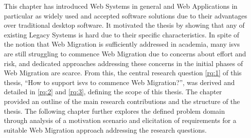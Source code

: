 This chapter has introduced \glspl{Web System} in general and \glspl{Web Application} in particular as widely used and accepted software solutions due to their advantages over traditional desktop software.
It motivated the thesis by showing that any  of existing \glspl{Legacy System} is hard due to their specific characteristics.
In spite of the notion that \gls{Web Migration} is sufficiently addressed in academia, many \glspl{isv} are still struggling to commence \gls{Web Migration} due to concerns about effort and risk, and dedicated approaches addressing these concerns in the initial phases of \gls{Web Migration} are scarce.
From this, the central research question \cref{rq:1} of this thesis, ``How to support \glspl{isv} to commence \gls{Web Migration}?'', was derived and detailed in \cref{rq:2} and \cref{rq:3}, defining the scope of this thesis.
The chapter provided an outline of the main research contributions and the structure of the thesis.
The following chapter further explores the defined problem domain through analysis of a motivation scenario and elicitation of requirements for a suitable \gls{Web Migration} approach addressing the research questions.
